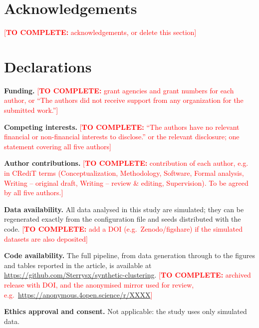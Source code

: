 \documentclass[pdflatex,referee]{sn-jnl}
\newcommand\TODO[1]{\textcolor{red}{[\textbf{TO COMPLETE:} #1]}}
\begin{document}
\section*{Acknowledgements}

\noindent\TODO{acknowledgements, or delete this section}

\section*{Declarations}

\noindent\textbf{Funding.} \TODO{grant agencies and grant numbers for each
author, or ``The authors did not receive support from any organization for the
submitted work.''}

\medskip
\noindent\textbf{Competing interests.} \TODO{``The authors have no relevant
financial or non-financial interests to disclose.'' or the relevant
disclosure; one statement covering all five authors}

\medskip
\noindent\textbf{Author contributions.} \TODO{contribution of each author,
e.g. in CRediT terms (Conceptualization, Methodology, Software, Formal
analysis, Writing -- original draft, Writing -- review \& editing,
Supervision). To be agreed by all five authors.}

\medskip
\noindent\textbf{Data availability.} All data analysed in this study are
simulated; they can be regenerated exactly from the configuration file and
seeds distributed with the code. \TODO{add a DOI (e.g.\ Zenodo/figshare) if the
simulated datasets are also deposited}

\medskip
\noindent\textbf{Code availability.} The full pipeline, from data generation
through to the figures and tables reported in the article, is available at
\url{https://github.com/Sterrysx/synthetic-clustering}. \TODO{archived release
with DOI, and the anonymised mirror used for review, e.g.\
\url{https://anonymous.4open.science/r/XXXX}}

\medskip
\noindent\textbf{Ethics approval and consent.} Not applicable: the study uses
only simulated data.
\end{document}
